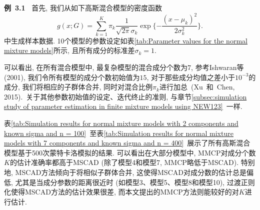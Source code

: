 \documentclass[a4paper,12pt,openany,oneside,utf-8]{ctexbook}
\newcommand{\xiaosihao}{\fontsize{12pt}{\baselineskip}\selectfont}
\begin{document}

\textbf{\xiaosihao 例~3.1~}
首先, 我们从如下高斯混合模型的密度函数
\begin{equation*}
  g(x; G)=\sum_{k=1}^{K} \pi_{k} \frac{1}{\sqrt{2\pi}\sigma_{k}} \exp\{-\frac{(x-\mu_{k})^2}{2\sigma_{k}^2}\}.
\end{equation*}
中生成样本数据. 10个模型的参数设定如表\ref{tab:Parameter values for the normal mixture models}所示, 且所有成分的标准差$\sigma_{k}=1$.

可以看出, 在所有混合模型中, 最复杂模型的混合成分个数为$7$, 参考Ishwaran等(2001), 我们令所有模型的成分个数初始值为$15$, 对于那些成分均值之差小于$10^{-3}$的成分, 我们将相应的子群体合并, 同时对混合比例$\pi_k$进行加总~(Xu~和~Chen, 2015).~关于其他参数初始值的设定、迭代终止的准则, 与章节\ref{subsec:simulation study of parameter estimation in finite mixture models using NEW123}~一样.

表\ref{tab:Simulation results for normal mixture models with 2 components and known sigma and n = 100}~至表\ref{tab:Simulation results for normal mixture models with 7 components and known sigma and n = 400}~展示了所有高斯混合模型基于500次蒙特卡洛模拟的结果. 可以看出在大部分模型中, MMCP对成分个数$K$的估计准确率都高于MSCAD (除了模型4和模型7, MMCP略低于MSCAD). 特别地, MSCAD方法倾向于将相似子群体合并, 这使得MSCAD对成分数的估计总是偏低, 尤其是当成分参数的距离很近时 (如模型3、模型5、模型8和模型10), 过渡正则化使得MSCAD方法的估计效果很差, 而本文提出的MMCP方法则能较好的对$K$进行估计.
\end{document}
